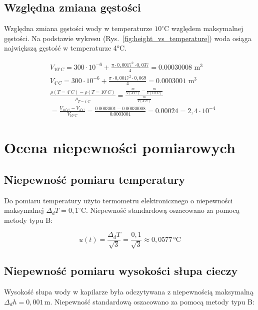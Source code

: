\documentclass[a4paper,12pt]{article}
\begin{document}
\subsection{Względna zmiana gęstości}

Względna zmiana gęstości wody w temperaturze $10^\circ$C względem maksymalnej gęstości. Na podstawie wykresu (Rys.~\ref{fig:height_vs_temperature}) woda osiąga największą gęstość w temperaturze 4°C.

\begin{align*}
     & V_{10^\circ C} = 300 \cdot 10^{-6} + \frac{\pi \cdot 0{,}0017^2 \cdot 0{,}037}{4} = 0.00030008 \text{ m}^3                                          \\
     & V_{4^\circ C} = 300 \cdot 10^{-6} + \frac{\pi \cdot 0{,}0017^2 \cdot 0{,}069}{4} = 0.0003001 \text{ m}^3                                            \\
     & \frac{\rho(T=4^\circ C) - \rho(T=10^\circ C)}{\rho_{T=4^\circ C}} = \frac{\frac{m}{V(4^\circ C)} - \frac{m}{V(10^\circ C)}}{\frac{m}{V(4^\circ C)}} \\
     & = \frac{V_{10^\circ C} - V_{4^\circ C}}{V_{10^\circ C}} = \frac{0.0003001 - 0.00030008}{0.0003001} = 0.00024 = 2{,}4 \cdot 10^{-4}
\end{align*}

\section{Ocena niepewności pomiarowych}

\subsection{Niepewność pomiaru temperatury}

Do pomiaru temperatury użyto termometru elektronicznego o niepewności maksymalnej $\Delta_d T = 0{,}1^\circ$C. Niepewność standardową oszacowano za pomocą metody typu B:

\begin{equation}
    u(t) = \frac{\Delta_d T}{\sqrt{3}} = \frac{0{,}1}{\sqrt{3}} \approx 0{,}0577\,\text{°C}
\end{equation}

\subsection{Niepewność pomiaru wysokości słupa cieczy}

Wysokość słupa wody w kapilarze była odczytywana z niepewnością maksymalną $\Delta_d h = 0{,}001\,\text{m}$. Niepewność standardową oszacowano za pomocą metody typu B:
\end{document}

